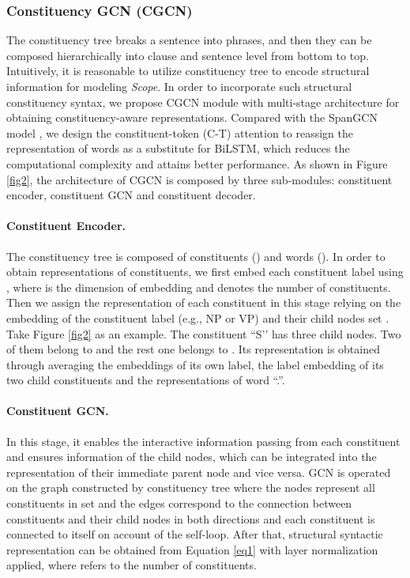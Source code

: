 \documentclass{article}
\begin{document}
\subsubsection{Constituency GCN (CGCN)}

The constituency tree breaks a sentence into phrases, and then they can be composed hierarchically into clause and sentence level from bottom to top. Intuitively, it is reasonable to utilize constituency tree to encode structural information for modeling \emph{Scope}. In order to incorporate such structural constituency syntax, we propose CGCN module with multi-stage architecture for obtaining constituency-aware representations. Compared with the SpanGCN model \cite{marcheggiani2020graph}, we design the constituent-token (C-T) attention to reassign the representation of words as a substitute for BiLSTM, which reduces the computational complexity and attains better performance. As shown in Figure \ref{fig2}, the architecture of CGCN is composed by three sub-modules: constituent encoder, constituent GCN and constituent decoder.

\paragraph{Constituent Encoder.}

The constituency tree is composed of constituents () and words (). In order to obtain representations of constituents, we first embed each constituent label using , where  is the dimension of embedding and  denotes the number of constituents. Then we assign the representation of each constituent  in this stage relying on the embedding of the constituent label (e.g., NP or VP) and their child nodes set . Take Figure \ref{fig2} as an example. The constituent ``S’’ has three child nodes. Two of them belong to  and the rest one belongs to . Its representation is obtained through averaging the embeddings of its own label, the label embedding of its two child constituents and the representations of word ``.''. 

\paragraph{Constituent GCN.}

In this stage, it enables the interactive information passing from each constituent and ensures information of the child nodes, which can be integrated into the representation of their immediate parent node and vice versa. GCN is operated on the graph constructed by constituency tree where the nodes represent all constituents in set  and the edges correspond to the connection between constituents and their child nodes in both directions and each constituent is connected to itself on account of the self-loop. After that, structural syntactic representation  can be obtained from Equation \ref{eq1} with layer normalization applied, where  refers to the number of constituents.
\end{document}
